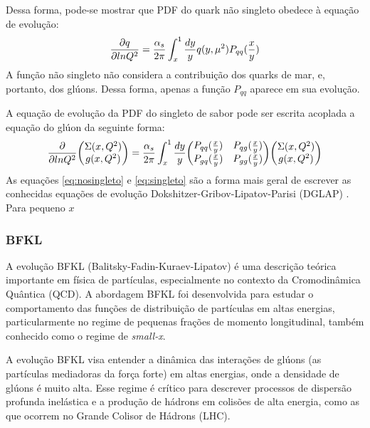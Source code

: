  Dessa forma, pode-se mostrar que PDF do quark não singleto obedece à equação de evolução:
 \begin{equation}
        \pdv{q}{lnQ^2} = \frac{\alpha_s}{2\pi} \int^1_x \frac{dy}{y} q(y,\mu^2) P_{qq}(\frac{x}{y})
        \label{eq:nosingleto}
 \end{equation}
A função não singleto não considera a contribuição dos quarks de mar, e, portanto, dos glúons. Dessa forma, apenas a função $P_{qq}$ aparece em sua evolução. 

A equação de evolução da PDF do singleto de sabor pode ser escrita acoplada a equação do glúon da seguinte forma:
\begin{equation}
        \pdv{lnQ^2}\qty(\begin{matrix} \Sigma(x,Q^2) \\g(x,Q^2)\end{matrix}) = \frac{\alpha_s}{2\pi} \int^1_x \frac{dy}{y} \qty(\begin{matrix}
            P_{qq}(\frac{x}{y} ) &  P_{qg}(\frac{x}{y})\\ P_{gq}(\frac{x}{y}) & P_{gg}(\frac{x}{y}) 
        \end{matrix})\qty(\begin{matrix} \Sigma(x,Q^2) \\g(x,Q^2)\end{matrix})
        \label{eq:singleto}
 \end{equation}
As equações  \eqref{eq:nosingleto} e \eqref{eq:singleto} são a forma mais geral de escrever as conhecidas  equações de evolução  Dokshitzer-Gribov-Lipatov-Parisi (DGLAP) . Para pequeno $x$  
\subsubsection{BFKL}
 
A evolução BFKL (Balitsky-Fadin-Kuraev-Lipatov) é uma descrição teórica importante em física de partículas, especialmente no contexto da Cromodinâmica Quântica (QCD). A abordagem BFKL foi desenvolvida para estudar o comportamento das funções de distribuição de partículas em altas energias, particularmente no regime de pequenas frações de momento longitudinal, também conhecido como o regime de \textit{small-x}.

A evolução BFKL visa entender a dinâmica das interações de glúons (as partículas mediadoras da força forte) em altas energias, onde a densidade de glúons é muito alta. Esse regime é crítico para descrever processos de dispersão profunda inelástica e a produção de hádrons em colisões de alta energia, como as que ocorrem no Grande Colisor de Hádrons (LHC).


